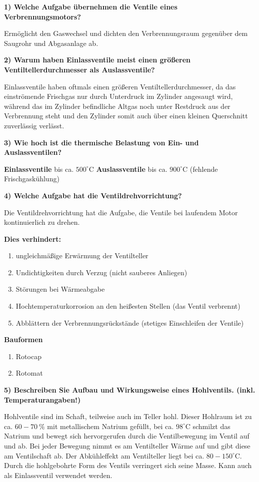 \textbf{1) Welche Aufgabe übernehmen die Ventile eines
Verbrennungsmotors?}

Ermöglicht den Gaswechsel und dichten den Verbrennungsraum gegenüber dem
Saugrohr und Abgasanlage ab.

\textbf{2) Warum haben Einlassventile meist einen größeren
Ventiltellerdurchmesser als Auslassventile?}

Einlassventile haben oftmals einen größeren Ventiltellerdurchmesser, da
das einströmende Frischgas nur durch Unterdruck im Zylinder angesaugt
wird, während das im Zylinder befindliche Altgas noch unter Restdruck
aus der Verbrennung steht und den Zylinder somit auch über einen kleinen
Querschnitt zuverlässig verlässt.

\textbf{3) Wie hoch ist die thermische Belastung von Ein- und
Auslassventilen?}

\textbf{Einlassventile} bis ca. $500^\circ\text{C}$
\textbf{Auslassventile} bis ca. $900^\circ\text{C}$ (fehlende
Frischgaskühlung)

\textbf{4) Welche Aufgabe hat die Ventildrehvorrichtung?}

Die Ventildrehvorrichtung hat die Aufgabe, die Ventile bei laufendem
Motor kontinuierlich zu drehen.

\textbf{Dies verhindert:}

\begin{enumerate}
\item
  ungleichmäßige Erwärmung der Ventilteller
\item
  Undichtigkeiten durch Verzug (nicht sauberes Anliegen)
\item
  Störungen bei Wärmeabgabe
\item
  Hochtemperaturkorrosion an den heißesten Stellen (das Ventil
  verbrennt)
\item
  Abblättern der Verbrennungsrückstände (stetiges Einschleifen der
  Ventile)
\end{enumerate}

\textbf{Bauformen}

\begin{enumerate}
\item
  Rotocap
\item
  Rotomat
\end{enumerate}

\textbf{5) Beschreiben Sie Aufbau und Wirkungsweise eines Hohlventils.
(inkl. Temperaturangaben!)}

Hohlventile sind im Schaft, teilweise auch im Teller hohl. Dieser
Hohlraum ist zu ca. $60 - 70~\%$ mit metallischem Natrium gefüllt, bei
ca. $98^\circ\text{C}$ schmilzt das Natrium und bewegt sich
hervorgerufen durch die Ventilbewegung im Ventil auf und ab. Bei jeder
Bewegung nimmt es am Ventilteller Wärme auf und gibt diese am
Ventilschaft ab. Der Abkühleffekt am Ventilteller liegt bei ca.
$80 - 150^\circ\text{C}$. Durch die hohlgebohrte Form des Ventils
verringert sich seine Masse. Kann auch als Einlassventil verwendet
werden.

